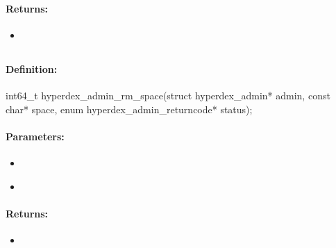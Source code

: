 \paragraph{Returns:}
\begin{itemize}[noitemsep]
\item {}\\

\end{itemize}

\pagebreak
\subsection{}
\label{api:c:rm_space}


\paragraph{Definition:}
\begin{ccode}
int64_t hyperdex_admin_rm_space(struct hyperdex_admin* admin,
        const char* space,
        enum hyperdex_admin_returncode* status);
\end{ccode}

\paragraph{Parameters:}
\begin{itemize}[noitemsep]
\item {}\\

\item {}\\

\end{itemize}

\paragraph{Returns:}
\begin{itemize}[noitemsep]
\item {}\\

\end{itemize}

